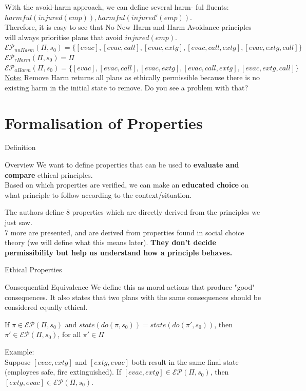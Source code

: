 \documentclass[compress,xcolor=table]{beamer}
\begin{document}
\begin{frame}
    With the avoid-harm approach, we can define several harm-
ful fluents: $harmful(injured(emp)), harmful(injured'(emp))$.\\
Therefore, it is easy to see that No New Harm and Harm
Avoidance principles will always prioritise plans that avoid $injured(emp)$.\\
\vfill
\pause
\small
$\mathcal{EP}_{nnHarm}(\Pi, s_0) = \{[evac], [evac, call], [evac, extg], [evac, call, extg], [evac, extg, call]\}$\\
$\mathcal{EP}_{rHarm}(\Pi, s_0) = \Pi$\\
$\mathcal{EP}_{aHarm}(\Pi, s_0) = \{[evac], [evac, call], [evac, extg], [evac, call, extg], [evac, extg, call]\}$\\
\vfill
\pause
\tiny
\underline{Note:} Remove Harm returns all plans as ethically permissible because there is no existing harm in the initial state to remove. Do you see a problem with that?
\end{frame}

\section{Formalisation of Properties}

\begin{frame}{Definition}
    \begin{alertblock}{Overview}
        We want to define properties that can be used to \textbf{evaluate and compare} ethical principles.\\
        Based on which properties are verified, we can make an \textbf{educated choice} on what principle to follow
        according to the context/situation.
    \end{alertblock}
    \pause
    The authors define 8 properties which are directly derived from the principles we just saw.\\
    7 more are presented, and are derived from properties found in social choice theory (we will define what this means later).
    \vfill
    \pause
    \textbf{They don't decide permissibility but help us understand how a principle behaves.}

\end{frame}

\begin{frame}{Ethical Properties}
    \begin{block}{Consequential Equivalence}
        We define this as moral actions that produce "good" consequences. It also states that two plans
        with the same consequences should be considered equally ethical.
    \end{block}
    If $\pi \in \mathcal{EP}(\Pi, s_0)$ and $state(do(\pi, s_0)) = state(do(\pi', s_0))$, then $\pi' \in \mathcal{EP}(\Pi, s_0)$, for all $\pi' \in \Pi$
    
    Example: \\
    Suppose $[evac,extg]$ and $[extg,evac]$ both result in the same final state (employees safe, fire extinguished).
    If $[evac,extg] \in \mathcal{EP}(\Pi, s_0)$, then $[extg,evac] \in \mathcal{EP}(\Pi, s_0)$.

\end{frame}
\end{document}
